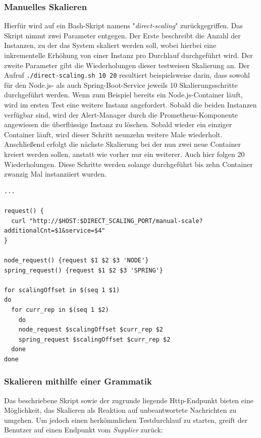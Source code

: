 \subsubsection{Manuelles Skalieren}
\label{erklaerungDirScal}
Hierfür wird auf ein Bash-Skript namens "\emph{direct-scaling}" zurückgegriffen. Das Skript nimmt zwei Parameter entgegen. Der Erste beschreibt die Anzahl der Instanzen, zu der das System skaliert werden soll, wobei hierbei eine inkrementelle Erhöhung von einer Instanz pro Durchlauf durchgeführt wird. Der zweite Parameter gibt die Wiederholungen dieser testweisen Skalierung an. Der Aufruf \verb+./direct-scaling.sh 10 20+ resultiert beispielsweise darin, dass sowohl für den Node.js- als auch Spring-Boot-Service jeweils 10 Skalierungsschritte durchgeführt werden. Wenn zum Beispiel bereits ein Node.js-Container läuft, wird im ersten Test eine weitere Instanz angefordert. Sobald die beiden Instanzen verfügbar sind, wird der Alert-Manager durch die Prometheus-Komponente angewiesen die überflüssige Instanz zu löschen. Sobald wieder ein einziger Container läuft, wird dieser Schritt neunzehn weitere Male wiederholt. Anschließend erfolgt die nächste Skalierung bei der nun zwei neue Container kreiert werden sollen, anstatt wie vorher nur ein weiterer. Auch hier folgen 20 Wiederholungen. Diese Schritte werden solange durchgeführt bis zehn Container zwanzig Mal instanziiert wurden.

\label{lst:direct-scaling}
\begin{minipage}{\linewidth}
\begin{lstlisting}[caption={direct-scaling.sh},style=bashStyle]
...

request() {
  curl "http://$HOST:$DIRECT_SCALING_PORT/manual-scale?additionalCnt=$1&service=$4"
}

node_request() {request $1 $2 $3 'NODE'}
spring_request() {request $1 $2 $3 'SPRING'}

for scalingOffset in $(seq 1 $1)
do 
  for curr_rep in $(seq 1 $2)
	do 
    node_request $scalingOffset $curr_rep $2
    spring_request $scalingOffset $curr_rep $2
  done
done
\end{lstlisting}
\end{minipage}

\subsubsection{Skalieren mithilfe einer Grammatik}
Das beschriebene Skript sowie der zugrunde liegende Http-Endpunkt bieten eine Möglichkeit, das Skalieren als Reaktion auf unbeantwortete Nachrichten zu umgehen. Um jedoch einen herkömmlichen Testdurchlauf zu starten, greift der Benutzer auf einen Endpunkt vom \emph{Supplier} zurück: 

